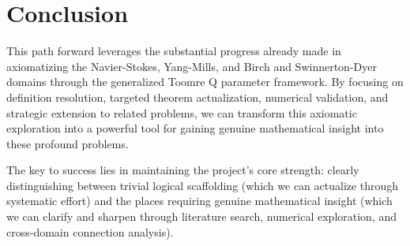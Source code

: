 \documentclass[11pt]{article}
\begin{document}
\section{Conclusion}

This path forward leverages the substantial progress already made in axiomatizing the Navier-Stokes, Yang-Mills, and Birch and Swinnerton-Dyer domains through the generalized Toomre Q parameter framework. By focusing on definition resolution, targeted theorem actualization, numerical validation, and strategic extension to related problems, we can transform this axiomatic exploration into a powerful tool for gaining genuine mathematical insight into these profound problems.

The key to success lies in maintaining the project's core strength: clearly distinguishing between trivial logical scaffolding (which we can actualize through systematic effort) and the places requiring genuine mathematical insight (which we can clarify and sharpen through literature search, numerical exploration, and cross-domain connection analysis).
\end{document}
